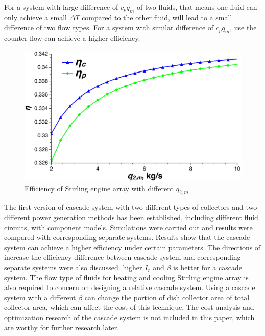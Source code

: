 \documentclass{article}
\begin{document}
For a system with large difference of $c_pq_m$ of two fluids, that means one fluid can only achieve a small $\Delta T$ compared to the other fluid, will lead to a small difference of two flow types. For a system with similar difference of $c_pq_m$, use the counter flow can achieve a higher efficiency.

\noindent \begin{figure}[H]
\begin{center}
	\includegraphics[width = 0.8\columnwidth, angle = 0]{./graphics/SEAflowtypes}
	\caption{Efficiency of Stirling engine array with different $q_{2,m}$}
	\label{fig:SEAflowtypes}
\end{center}
\end{figure}

The first version of cascade system with two different types of collectors and two different power generation methods has been established, including different fluid circuits, with component models. Simulations were carried out and results were compared with corresponding separate systems. Results show that the cascade system can achieve a higher efficiency under certain parameters. The directions of increase the efficiency difference between cascade system and corresponding separate systems were also discussed. higher $I_r$ and $\beta$ is better for a cascade system. The flow type of fluids for heating and cooling Stirling engine array is also required to concern on designing a relative cascade system. Using a cascade system with a different $\beta$ can change the portion of dish collector area of total collector area, which can affect the cost of this technique. The cost analysis and optimization research of the cascade system is not included in this paper, which are worthy for further research later.

\clearpage
\printnomenclature[2.5cm]{}
\clearpage



\end{document}

